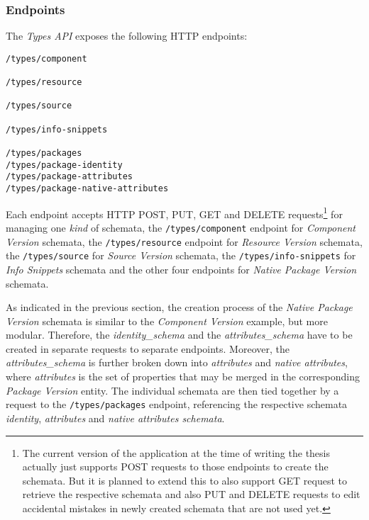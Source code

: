 \subsubsection{Endpoints}
The \emph{Types API} exposes the following HTTP endpoints:

\begin{lstlisting}[basicstyle=\tiny, caption=Types API Endpoints, captionpos=b, label=lst:TypesEndpoints]
/types/component

/types/resource

/types/source

/types/info-snippets

/types/packages
/types/package-identity
/types/package-attributes
/types/package-native-attributes
\end{lstlisting}

Each endpoint accepts HTTP POST, PUT, GET and DELETE requests\footnote{The current version of the application at the time of writing the thesis actually just supports POST requests to those endpoints to create the schemata. But it is planned to extend this to also support GET request to retrieve the respective schemata and also PUT and DELETE requests to edit accidental mistakes in newly created schemata that are not used yet.} for managing one \emph{kind} of schemata, the \lstinline|/types/component| endpoint for \emph{Component Version} schemata, the \lstinline|/types/resource| endpoint for \emph{Resource Version} schemata, the \lstinline|/types/source| for \emph{Source Version} schemata, the \lstinline|/types/info-snippets| for \emph{Info Snippets} schemata and the other four endpoints for \emph{Native Package Version} schemata.\par
As indicated in the previous section, the creation process of the \emph{Native Package Version} schemata is similar to the \emph{Component Version} example, but more modular. Therefore, the \emph{identity\_schema} and the \emph{attributes\_schema} have to be created in separate requests to separate endpoints. Moreover, the \emph{attributes\_schema} is further broken down into \emph{attributes} and \emph{native attributes}, where \emph{attributes} is the set of properties that may be merged in the corresponding \emph{Package Version} entity. The individual schemata are then tied together by a request to the \lstinline|/types/packages| endpoint, referencing the respective schemata \emph{identity}, \emph{attributes} and \emph{native attributes schemata}.\\

